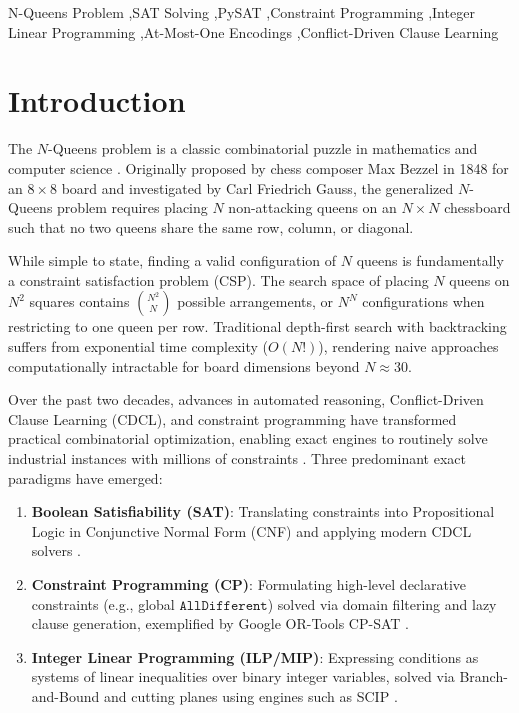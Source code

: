 \documentclass[a4paper,fleqn]{cas-sc}
\begin{document}
\begin{keywords}
N-Queens Problem \sep SAT Solving \sep PySAT \sep Constraint Programming \sep Integer Linear Programming \sep At-Most-One Encodings \sep Conflict-Driven Clause Learning
\end{keywords}

\maketitle

\section{Introduction}
The $N$-Queens problem is a classic combinatorial puzzle in mathematics and computer science \citep{bell1969queens}. Originally proposed by chess composer Max Bezzel in 1848 for an $8 \times 8$ board and investigated by Carl Friedrich Gauss, the generalized $N$-Queens problem requires placing $N$ non-attacking queens on an $N \times N$ chessboard such that no two queens share the same row, column, or diagonal.

While simple to state, finding a valid configuration of $N$ queens is fundamentally a constraint satisfaction problem (CSP). The search space of placing $N$ queens on $N^2$ squares contains $\binom{N^2}{N}$ possible arrangements, or $N^N$ configurations when restricting to one queen per row. Traditional depth-first search with backtracking suffers from exponential time complexity ($O(N!)$), rendering naive approaches computationally intractable for board dimensions beyond $N \approx 30$.

Over the past two decades, advances in automated reasoning, Conflict-Driven Clause Learning (CDCL), and constraint programming have transformed practical combinatorial optimization, enabling exact engines to routinely solve industrial instances with millions of constraints \citep{biere2021handbook}. Three predominant exact paradigms have emerged:
\begin{enumerate}
    \item \textbf{Boolean Satisfiability (SAT)}: Translating constraints into Propositional Logic in Conjunctive Normal Form (CNF) and applying modern CDCL solvers \citep{biere2024cadical, audemard2018glucose}.
    \item \textbf{Constraint Programming (CP)}: Formulating high-level declarative constraints (e.g., global $\mathtt{AllDifferent}$) solved via domain filtering and lazy clause generation, exemplified by Google OR-Tools CP-SAT \citep{perron2024ortools}.
    \item \textbf{Integer Linear Programming (ILP/MIP)}: Expressing conditions as systems of linear inequalities over binary integer variables, solved via Branch-and-Bound and cutting planes using engines such as SCIP \citep{gamrath2020scip}.
\end{enumerate}
\end{document}
